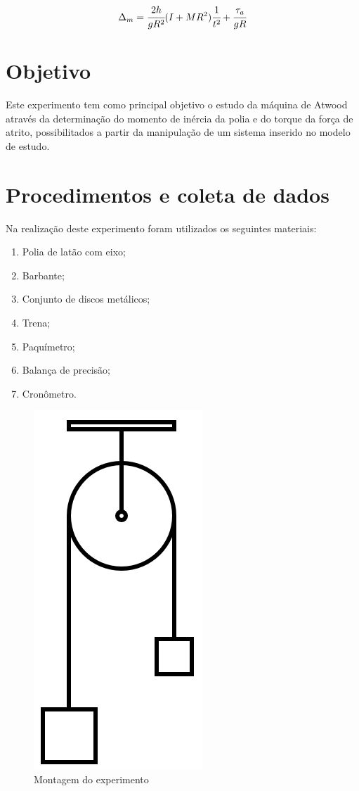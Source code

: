 \documentclass[a4paper]{article}
\begin{document}
\begin{align}
\Delta_m=\cfrac{2h}{gR^{2}}(I+MR^{2})\ensuremath{\cfrac{1}{t^{2}}}+\cfrac{\tau_{a}}{gR}
\end{align}


\section{Objetivo}
Este experimento tem como principal objetivo o estudo da máquina de Atwood através da determinação do momento de inércia da polia e do torque da força de atrito, possibilitados a partir da manipulação de um sistema inserido no modelo de estudo.


\section{Procedimentos e coleta de dados}

Na realização deste experimento foram utilizados os seguintes materiais: 
\begin{enumerate} 
	\item Polia de latão com eixo;
	\item Barbante;
	\item Conjunto de discos metálicos;
	\item Trena;
	\item Paquímetro;
	\item Balança de precisão;
	\item Cronômetro.
 \end {enumerate} 

\begin{figure}[!ht]
	\centering
	\includegraphics[scale=0.25]{Atwood_machine.jpg}
	\caption{Montagem do experimento}
\end{figure}
\end{document}
